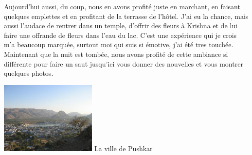 \begin{multicols}{2}
Aujourd'hui aussi, du coup, nous en avons profité juste en marchant, en faisant quelques emplettes et en profitant de la terrasse de l'hôtel. J'ai eu la chance, mais aussi l'audace de rentrer dans un temple, d'offrir des fleurs à Krishna et de lui faire une offrande de fleurs dans l'eau du lac. C'est une expérience qui je crois m'a beaucoup marquée, surtout moi qui suis si émotive, j'ai été tres touchée.  Maintenant que la nuit est tombée, nous avons profité de cette ambiance si différente pour faire un saut jusqu'ici vous donner des nouvelles et vous montrer quelques photos.

\hspace*{-0.65cm}
\includegraphics[width=4.8cm]{articles/Journees-zen/pushkar.jpg}
La ville de Pushkar

\end{multicols}
